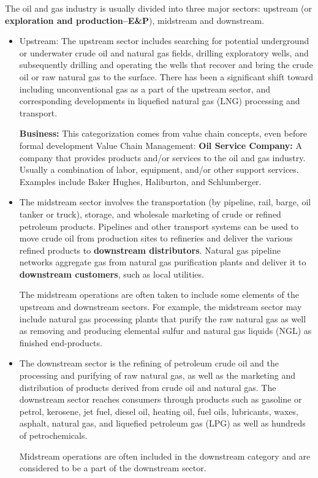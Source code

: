 \documentclass[12pt,a4paper]{article}
\begin{document}
The oil and gas industry is usually divided into three major sectors:
upstream (or \textbf{exploration and production--E\&P}), midstream and
downstream.
\begin{itemize}[noitemsep,topsep=0pt]
\item Upstream: The upstream sector includes searching for potential
  underground or underwater crude oil and natural gas fields, drilling
  exploratory wells, and subsequently drilling and operating the wells that
  recover and bring the crude oil or raw natural gas to the surface.
  There has been a significant shift toward including unconventional gas as
  a part of the upstream sector, and corresponding developments in liquefied
  natural gas (LNG) processing and transport.

  \textbf{Business:} This categorization comes from value chain concepts,
  even before formal development Value Chain Management: \textbf{Oil Service
    Company:} A company that provides products and/or services to the oil
  and gas industry.  Usually a combination of labor, equipment, and/or other
  support services.  Examples include Baker Hughes, Haliburton, and
  Schlumberger.
\item The midstream sector involves the transportation (by pipeline, rail,
  barge, oil tanker or truck), storage, and wholesale marketing of crude or
  refined petroleum products. Pipelines and other transport systems can be
  used to move crude oil from production sites to refineries and deliver the
  various refined products to \textbf{downstream distributors}. Natural gas
  pipeline networks aggregate gas from natural gas purification plants and
  deliver it to \textbf{downstream customers}, such as local utilities.

  The midstream operations are often taken to include some elements of the
  upstream and downstream sectors. For example, the midstream sector may
  include natural gas processing plants that purify the raw natural gas as
  well as removing and producing elemental sulfur and natural gas liquids
  (NGL) as finished end-products.
\item The downstream sector is the refining of petroleum crude oil and the
  processing and purifying of raw natural gas, as well as the marketing
  and distribution of products derived from crude oil and natural gas. The
  downstream sector reaches consumers through products such as gasoline or
  petrol, kerosene, jet fuel, diesel oil, heating oil, fuel oils,
  lubricants, waxes, asphalt, natural gas, and liquefied petroleum gas (LPG)
  as well as hundreds of petrochemicals.

  Midstream operations are often included in the downstream category and are
  considered to be a part of the downstream sector.
\end{itemize}
\end{document}
